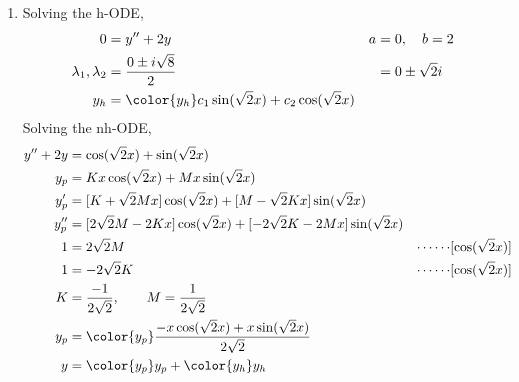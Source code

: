 \begin{enumerate}
    \item Solving the h-ODE,
          \begin{align}
              0                        & = y'' + 2y                         &
              a                        & = 0, \quad b = 2                     \\
              \lambda_{1}, \lambda_{2} & = \frac{0 \pm i\sqrt{8}}{2}        &
                                       & = 0 \pm \sqrt{2}i                    \\
              y_{h}                    & = \color{y_h} c_{1}\sin(\sqrt{2}x)
              + c_{2}\cos(\sqrt{2}x)
          \end{align}
          Solving the nh-ODE,
          \begin{align}
              y'' + 2y     & = \cos(\sqrt{2}x) + \sin(\sqrt{2}x)           \\
              y_{p}        & = Kx \cos(\sqrt{2}x) + Mx \sin(\sqrt{2}x)     \\
              y_{p}'       & = [K + \sqrt{2}Mx] \cos(\sqrt{2}x)
              + [M - \sqrt{2}Kx] \sin(\sqrt{2}x)                           \\
              y_{p}''      & = [2\sqrt{2}M - 2Kx] \cos(\sqrt{2}x)
              + [-2\sqrt{2}K - 2Mx] \sin(\sqrt{2}x)                        \\
              1            & = 2\sqrt{2}M                                &
              \cdots\cdots & [\cos(\sqrt{2}x)]                             \\
              1            & = -2\sqrt{2}K                               &
              \cdots\cdots & [\cos(\sqrt{2}x)]                             \\
              K            & = \frac{-1}{2\sqrt{2}}, \qquad M
              = \frac{1}{2\sqrt{2}}                                        \\
              y_{p}        & = \color{y_p} \frac{-x\cos(\sqrt{2}x)
              + x\sin(\sqrt{2}x)}{2\sqrt{2}}                               \\
              y            & = {\color{y_p} y_{p}} + {\color{y_h} y_{h}}
          \end{align}


\end{enumerate}
